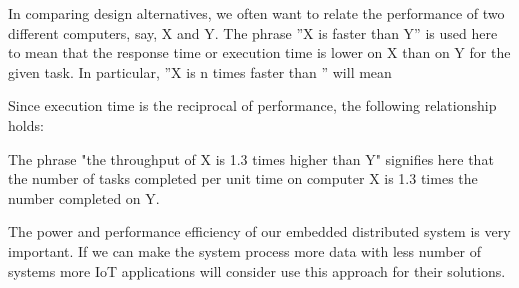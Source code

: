 In comparing design alternatives, we often want to relate the performance of
two different computers, say, X and Y. The phrase ''X is faster than Y'' is
used here to mean that the response time or execution time is lower on X than
on Y for the given task. In particular, ''X is n times faster than ''  will
mean

Since execution time is the reciprocal of performance, the following
relationship holds:

The phrase "the throughput of X is 1.3 times higher than Y" signifies here that
the number of tasks completed per unit time on computer X is 1.3 times the
number completed on Y.

The power and performance efficiency of our embedded distributed system is very
important. If we can  make the system process more data with less number
of systems more IoT applications will consider use this approach for their
solutions.

\clearpage

